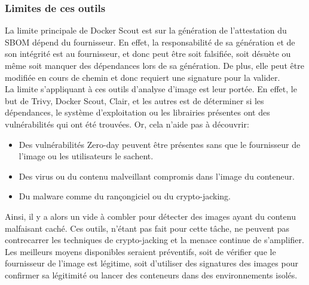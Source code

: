 \subsubsection{Limites de ces outils}
La limite principale de Docker Scout est sur la génération de l'attestation du SBOM dépend du fournisseur. En effet, la responsabilité de sa génération et de son intégrité est au fournisseur, et donc peut être soit falsifiée, soit désuète ou même soit manquer des dépendances lors de sa génération. De plus, elle peut être modifiée en cours de chemin et donc requiert une signature pour la valider. \\
\newline
La limite s'appliquant à ces outils d'analyse d'image est leur portée. En effet, le but de Trivy, Docker Scout, Clair, et les autres est de déterminer si les dépendances, le système d'exploitation ou les librairies présentes ont des vulnérabilités qui ont été trouvées. Or, cela n'aide pas à découvrir:
\begin{itemize}
    \item Des vulnérabilités Zero-day peuvent être présentes sans que le fournisseur de l'image ou les utilisateurs le sachent.
    \item Des virus ou du contenu malveillant compromis dans l'image du conteneur.
    \item Du malware comme du rançongiciel ou du crypto-jacking.
\end{itemize}
Ainsi, il y a alors un vide à combler pour détecter des images ayant du contenu malfaisant caché. Ces outils, n'étant pas fait pour cette tâche, ne peuvent pas contrecarrer les techniques de crypto-jacking et la menace continue de s'amplifier. Les meilleurs moyens disponibles seraient préventifs, soit de vérifier que le fournisseur de l'image est légitime, soit d'utiliser des signatures des images pour confirmer sa légitimité ou lancer des conteneurs dans des environnements isolés.
